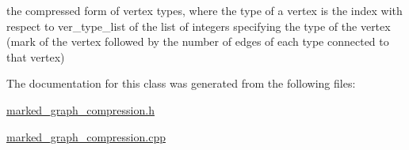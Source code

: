 the compressed form of vertex types, where the type of a vertex is the index with respect to ver\+\_\+type\+\_\+list of the list of integers specifying the type of the vertex (mark of the vertex followed by the number of edges of each type connected to that vertex) 



The documentation for this class was generated from the following files\+:\begin{DoxyCompactItemize}
\item 
\hyperlink{marked__graph__compression_8h}{marked\+\_\+graph\+\_\+compression.\+h}\item 
\hyperlink{marked__graph__compression_8cpp}{marked\+\_\+graph\+\_\+compression.\+cpp}\end{DoxyCompactItemize}
